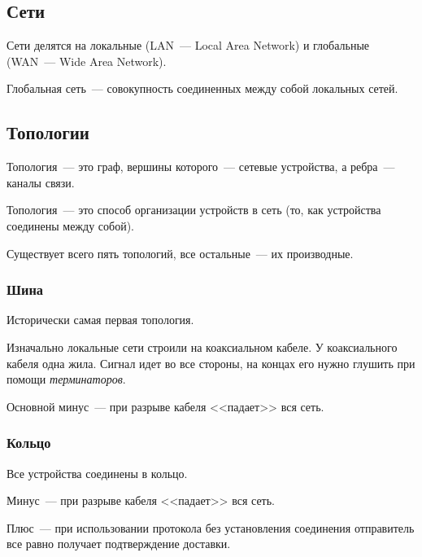 \subsection{Сети}

Сети делятся на локальные (LAN~--- Local Area Network) и глобальные (WAN~--- Wide Area Network).

Глобальная сеть~--- совокупность соединенных между собой локальных сетей.

\subsection{Топологии}

\begin{dd}
    Топология~--- это граф, вершины которого~--- сетевые устройства, а ребра~--- каналы связи.
\end{dd}

\begin{dd}
    Топология~--- это способ организации устройств в сеть (то, как устройства соединены между собой).
\end{dd}

Существует всего пять топологий, все остальные~--- их производные.

\subsubsection{Шина}

Исторически самая первая топология.


Изначально локальные сети строили на коаксиальном кабеле. У коаксиального кабеля одна жила. Сигнал идет во все стороны, на концах его нужно глушить при помощи \textit{терминаторов}.

Основной минус~--- при разрыве кабеля <<падает>> вся сеть.

\subsubsection{Кольцо}

Все устройства соединены в кольцо.


Минус~--- при разрыве кабеля <<падает>> вся сеть.

Плюс~--- при использовании протокола без установления соединения отправитель все равно получает подтверждение доставки.

